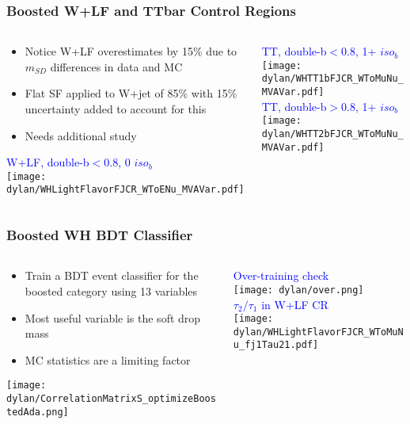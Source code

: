 \documentclass{beamer}
\begin{document}
\begin{frame}
  \frametitle{Boosted W+LF and TTbar Control Regions}

  \begin{columns}
    \begin{column}{0.55\linewidth}
      \begin{itemize}
      \item Notice W+LF overestimates by 15\% due to $m_{SD}$ differences in data and MC
      \item Flat SF applied to W+jet of 85\% with 15\% uncertainty added to account for this
      \item Needs additional study
      \end{itemize}
      \centering
      \textcolor{blue}{W+LF, double-b$< 0.8$, 0 $iso_b$} \\
      \texttt{[image: dylan/WHLightFlavorFJCR\_WToENu\_MVAVar.pdf]} \\
    \end{column}
    \begin{column}{0.45\linewidth}
      \centering
      \textcolor{blue}{TT, double-b$< 0.8$, 1+ $iso_b$} \\
      \texttt{[image: dylan/WHTT1bFJCR\_WToMuNu\_MVAVar.pdf]} \\
      \textcolor{blue}{TT, double-b$> 0.8$, 1+ $iso_b$} \\
      \texttt{[image: dylan/WHTT2bFJCR\_WToMuNu\_MVAVar.pdf]}
    \end{column}
  \end{columns}

\end{frame}

\begin{frame}
  \frametitle{Boosted WH BDT Classifier}
  \begin{columns}
    \begin{column}{0.5\linewidth}
      \begin{itemize}
      \item Train a BDT event classifier for the boosted category using 13 variables
      \item Most useful variable is the soft drop mass
      \item MC statistics are a limiting factor
      \end{itemize}
      \centering
      \texttt{[image: dylan/CorrelationMatrixS\_optimizeBoostedAda.png]}
    \end{column}
    \begin{column}{0.5\linewidth}
      \centering
      \textcolor{blue}{Over-training check} \\
      \texttt{[image: dylan/over.png]} \\
      \textcolor{blue}{$\tau_2/\tau_1$ in W+LF CR} \\
      \texttt{[image: dylan/WHLightFlavorFJCR\_WToMuNu\_fj1Tau21.pdf]}
    \end{column}
  \end{columns}
\end{frame}
\end{document}
